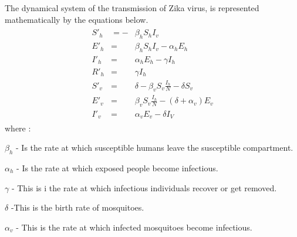 The dynamical system of the transmission of Zika virus, is represented mathematically by the equations below.
\begin{align}
\begin{array}{lcl}  S'_h & = -&\beta_h S_h I_v  \\ E'_h & = & \beta_h S_h I_v - \alpha_h E_h  
\\ I'_h &= &\alpha_h E_h - \gamma I_h 
\\ R'_h &=& \gamma I_h 
\\ 
S'_v &=& \delta -\beta_v S_v \frac{I_h}{N} - \delta S_v
\\ E'_v & = & \beta_v S_v \frac{I_h}{N} - (\delta + \alpha_v) E_v
\\ I'_v & = &\alpha_v E_v - \delta I_V
 \end{array}
\end{align}
where :

$\beta_h$  - Is the rate at which susceptible humans leave the susceptible compartment.

$\alpha_h$ -  Is the rate at which exposed people become infectious.

$\gamma$ - This is i the rate at which infectious individuals recover or get removed.

$\delta$ -This is the birth rate of mosquitoes.

$\alpha_v$ - This is the rate at which infected mosquitoes become infectious.



